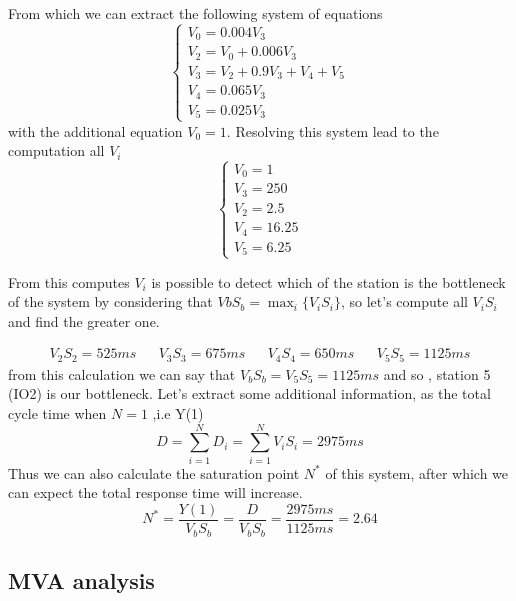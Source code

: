 \documentclass[12pt,a4paper]{article}
\begin{document}
    From which we can extract the following system of equations 
    \begin{displaymath}
        \begin{cases}
            V_0=0.004V_3\\
            V_2=V_0+0.006V_3\\
            V_3=V_2+0.9V_3+V_4+V_5\\
            V_4=0.065V_3\\
            V_5= 0.025V_3
        \end{cases}
    \end{displaymath}
    with the additional equation $V_0=1$. Resolving this system lead to the computation 
    all $V_i$ 
    \begin{displaymath}
        \begin{cases}
            V_0=1 \\
            V_3=250\\
            V_2=2.5\\
            V_4=16.25\\
            V_5=6.25
        \end{cases}
    \end{displaymath}

    From this computes $V_i$ is possible to detect which of the station is the bottleneck of the system
    by considering that $VbS_b= \max_i\{V_iS_i\}$, so let's compute all $V_iS_i$ and find 
    the greater one. 

    \begin{displaymath}
        \begin{aligned}
            V_2S_2= 525ms && V_3S_3=675ms && V_4S_4=650ms && V_5S_5= 1125ms
        \end{aligned}
    \end{displaymath}
    from this calculation we can say that $V_bS_b=V_5S_5=1125ms$ and so , station 5 (IO2) is 
    our bottleneck. Let's extract some additional information, as the total cycle time when $N=1$ ,i.e Y(1) 
    \begin{displaymath}
        D=\sum_{i=1}^{N}D_i=\sum_{i=1}^{N}V_iS_i=2975ms
    \end{displaymath}
    Thus we can also calculate the saturation point $N^*$ of this system, after which we can expect
    the total response time will increase. 
    \begin{displaymath}
        N^*=\frac{Y(1)}{V_bS_b}=\frac{D}{V_bS_b}=\frac{2975ms}{1125ms}=2.64
    \end{displaymath}
    \subsection{MVA analysis}
    
    
\end{document}
